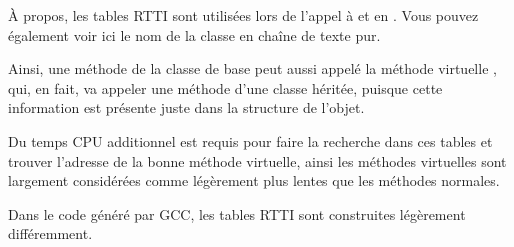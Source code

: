 À propos, les tables \ac{RTTI} sont utilisées lors de l'appel à 
et  en \Cpp.
Vous pouvez également voir ici le nom de la classe en chaîne de texte pur.

Ainsi, une méthode de la classe de base  peut aussi appelé la méthode
virtuelle , qui, en fait, va appeler une méthode d'une classe
héritée, puisque cette information est présente juste dans la structure de l'objet.


Du temps CPU additionnel est requis pour faire la recherche dans ces tables et trouver
l'adresse de la bonne  méthode virtuelle, ainsi les méthodes virtuelles sont largement
considérées comme légèrement plus lentes que les méthodes normales.

Dans le code généré par GCC, les tables \ac{RTTI} sont construites légèrement différemment.
